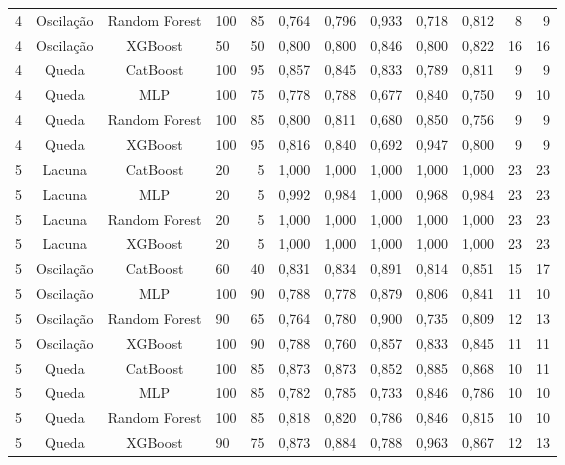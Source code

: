 \begin{longtable}{ccclrrrrrrrr}
4 & Oscilação & Random Forest & 100 & 85 & 0,764 & 0,796 & 0,933 & 0,718 & 0,812 & 8 & 9 \\
4 & Oscilação & XGBoost & 50 & 50 & 0,800 & 0,800 & 0,846 & 0,800 & 0,822 & 16 & 16 \\
4 & Queda & CatBoost & 100 & 95 & 0,857 & 0,845 & 0,833 & 0,789 & 0,811 & 9 & 9 \\
4 & Queda & MLP & 100 & 75 & 0,778 & 0,788 & 0,677 & 0,840 & 0,750 & 9 & 10 \\
4 & Queda & Random Forest & 100 & 85 & 0,800 & 0,811 & 0,680 & 0,850 & 0,756 & 9 & 9 \\
4 & Queda & XGBoost & 100 & 95 & 0,816 & 0,840 & 0,692 & 0,947 & 0,800 & 9 & 9 \\
5 & Lacuna & CatBoost & 20 & 5 & 1,000 & 1,000 & 1,000 & 1,000 & 1,000 & 23 & 23 \\
5 & Lacuna & MLP & 20 & 5 & 0,992 & 0,984 & 1,000 & 0,968 & 0,984 & 23 & 23 \\
5 & Lacuna & Random Forest & 20 & 5 & 1,000 & 1,000 & 1,000 & 1,000 & 1,000 & 23 & 23 \\
5 & Lacuna & XGBoost & 20 & 5 & 1,000 & 1,000 & 1,000 & 1,000 & 1,000 & 23 & 23 \\
5 & Oscilação & CatBoost & 60 & 40 & 0,831 & 0,834 & 0,891 & 0,814 & 0,851 & 15 & 17 \\
5 & Oscilação & MLP & 100 & 90 & 0,788 & 0,778 & 0,879 & 0,806 & 0,841 & 11 & 10 \\
5 & Oscilação & Random Forest & 90 & 65 & 0,764 & 0,780 & 0,900 & 0,735 & 0,809 & 12 & 13 \\
5 & Oscilação & XGBoost & 100 & 90 & 0,788 & 0,760 & 0,857 & 0,833 & 0,845 & 11 & 11 \\
5 & Queda & CatBoost & 100 & 85 & 0,873 & 0,873 & 0,852 & 0,885 & 0,868 & 10 & 11 \\
5 & Queda & MLP & 100 & 85 & 0,782 & 0,785 & 0,733 & 0,846 & 0,786 & 10 & 10 \\
5 & Queda & Random Forest & 100 & 85 & 0,818 & 0,820 & 0,786 & 0,846 & 0,815 & 10 & 10 \\
5 & Queda & XGBoost & 90 & 75 & 0,873 & 0,884 & 0,788 & 0,963 & 0,867 & 12 & 13 \\
\end{longtable}
